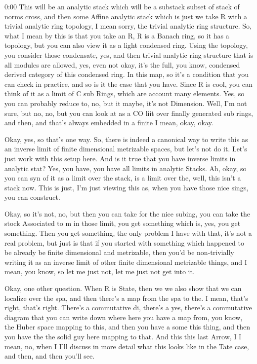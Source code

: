 \begin{unfinished}{0:00}
This will be an analytic stack which will be a substack subset of stack of norms cross, and then some Affine analytic stack which is just we take R with a trivial analytic ring topology, I mean sorry, the trivial analytic ring structure. So, what I mean by this is that you take an R, R is a Banach ring, so it has a topology, but you can also view it as a light condensed ring. Using the topology, you consider those condensate, yes, and then trivial analytic ring structure that is all modules are allowed, yes, even not okay, it's the full, you know, condensed derived category of this condensed ring.
In this map, so it's a condition that you can check in practice, and so is it the case that you have. Since R is cool, you can think of it as a limit of C sub Rings, which are account many elements. Yes, so you can probably reduce to, no, but it maybe, it's not Dimension. Well, I'm not sure, but no, no, but you can look at as a CO liit over finally generated sub rings, and then, and that's always embedded in a finite I mean, okay, okay.

Okay, yes, so that's one way. So, there is indeed a canonical way to write this as an inverse limit of finite dimensional metrizable spaces, but let's not do it. Let's just work with this setup here. And is it true that you have inverse limits in analytic stat? Yes, you have, you have all limits in analytic Stacks. Ah, okay, so you can syn of it as a limit over the stack, is a limit over the, well, this isn't a stack now. This is just, I'm just viewing this as, when you have those nice sings, you can construct.

Okay, so it's not, no, but then you can take for the nice subing, you can take the stock Associated to m in those limit, you get something which is, yes, you get something. Then you get something, the only problem I have with that, it's not a real problem, but just is that if you started with something which happened to be already be finite dimensional and metrizable, then you'd be non-trivially writing it as an inverse limit of other finite dimensional metrizable things, and I mean, you know, so let me just not, let me just not get into it.

Okay, one other question. When R is State, then we we also show that we can localize over the spa, and then there's a map from the spa to the. I mean, that's right, that's right. There's a commutative di, there's a yes, there's a commutative diagram that you can write down where here you have a map from, you know, the Huber space mapping to this, and then you have a some this thing, and then you have the the solid guy here mapping to that. And this this last Arrow, I I mean, no, when I I'll discuss in more detail what this looks like in the Tate case, and then, and then you'll see.


\end{unfinished}
